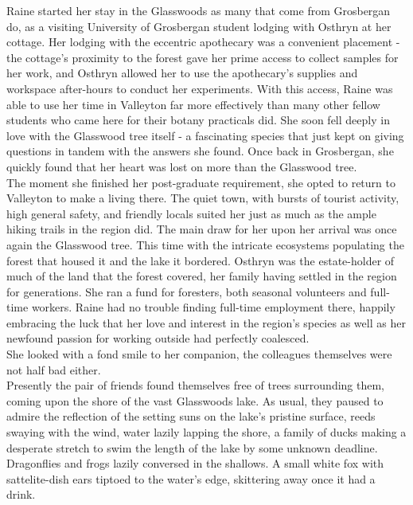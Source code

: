 Raine started her stay in the Glasswoods as many that come from Grosbergan do, as a visiting University of Grosbergan student lodging with Osthryn at her cottage.
Her lodging with the eccentric apothecary was a convenient placement - the cottage's proximity to the forest gave her prime access to collect samples for her work, and Osthryn allowed her to use the apothecary's supplies and workspace after-hours to conduct her experiments.
With this access, Raine was able to use her time in Valleyton far more effectively than many other fellow students who came here for their botany practicals did.
She soon fell deeply in love with the Glasswood tree itself - a fascinating species that just kept on giving questions in tandem with the answers she found.
Once back in Grosbergan, she quickly found that her heart was lost on more than the Glasswood tree.\\

The moment she finished her post-graduate requirement, she opted to return to Valleyton to make a living there. 
The quiet town, with bursts of tourist activity, high general safety, and friendly locals suited her just as much as the ample hiking trails in the region did.
The main draw for her upon her arrival was once again the Glasswood tree. 
This time with the intricate ecosystems populating the forest that housed it and the lake it bordered.
Osthryn was the estate-holder of much of the land that the forest covered, her family having settled in the region for generations. 
She ran a fund for foresters, both seasonal volunteers and full-time workers.
Raine had no trouble finding full-time employment there, happily embracing the luck that her love and interest in the region's species as well as her newfound passion for working outside had perfectly coalesced.\\

She looked with a fond smile to her companion, the colleagues themselves were not half bad either.\\

Presently the pair of friends found themselves free of trees surrounding them, coming upon the shore of the vast Glasswoods lake.
As usual, they paused to admire the reflection of the setting suns on the lake's pristine surface, reeds swaying with the wind, water lazily lapping the shore, a family of ducks making a desperate stretch to swim the length of the lake by some unknown deadline.
Dragonflies and frogs lazily conversed in the shallows. 
A small white fox with sattelite-dish ears tiptoed to the water's edge, skittering away once it had a drink.\\

